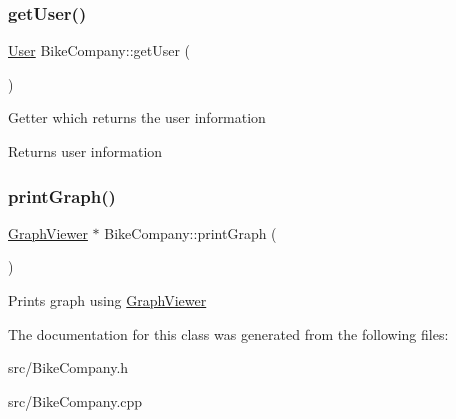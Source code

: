 \subsubsection{\texorpdfstring{get\+User()}{getUser()}}
{\footnotesize\ttfamily \mbox{\hyperlink{class_user}{User}} Bike\+Company\+::get\+User (\begin{DoxyParamCaption}{ }\end{DoxyParamCaption})\hspace{0.3cm}{\ttfamily [inline]}}

Getter which returns the user information \begin{DoxyReturn}{Returns}
user information 
\end{DoxyReturn}
\mbox{\label{class_bike_company_a5cdaee132eda4772a117b7f36cb94de3}} 
\subsubsection{\texorpdfstring{print\+Graph()}{printGraph()}}
{\footnotesize\ttfamily \mbox{\hyperlink{class_graph_viewer}{Graph\+Viewer}} $\ast$ Bike\+Company\+::print\+Graph (\begin{DoxyParamCaption}{ }\end{DoxyParamCaption})}

Prints graph using \mbox{\hyperlink{class_graph_viewer}{Graph\+Viewer}} 

The documentation for this class was generated from the following files\+:\begin{DoxyCompactItemize}
\item 
src/Bike\+Company.\+h\item 
src/Bike\+Company.\+cpp\end{DoxyCompactItemize}
